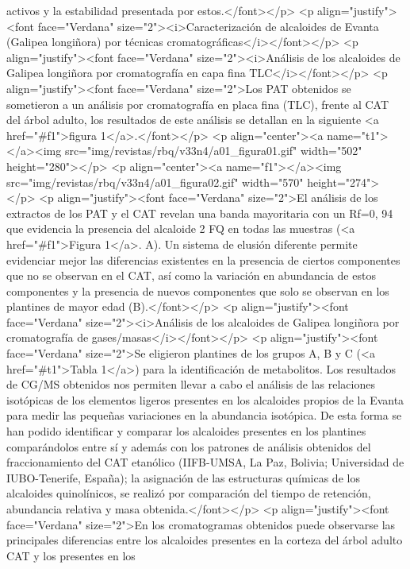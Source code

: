 activos y la estabilidad presentada por estos.</font></p> <p
align="justify"><font face="Verdana" size="2"><i>Caracterización de alcaloides
de Evanta (Galipea longiñora) por técnicas cromatográficas</i></font></p> <p
align="justify"><font face="Verdana" size="2"><i>Análisis de los alcaloides de
Galipea longiñora por cromatografía en capa fina TLC</i></font></p> <p
align="justify"><font face="Verdana" size="2">Los PAT obtenidos se sometieron a
un análisis por cromatografía en placa fina (TLC), frente al CAT del árbol
adulto, los resultados de este análisis se detallan en la siguiente <a
href="\#f1">figura 1</a>.</font></p> <p align="center"><a name="t1"></a><img
src="img/revistas/rbq/v33n4/a01\_{}figura01.gif" width="502" height="280"></p>
<p align="center"><a name="f1"></a><img
src="img/revistas/rbq/v33n4/a01\_{}figura02.gif" width="570" height="274"></p>
<p align="justify"><font face="Verdana" size="2">El análisis de los extractos de
los PAT y el CAT revelan una banda mayoritaria con un Rf=0, 94 que evidencia la
presencia del alcaloide 2 FQ en todas las muestras (<a href="\#f1">Figura 1</a>.
A). Un sistema de elusión diferente permite evidenciar mejor las diferencias
existentes en la presencia de ciertos componentes que no se observan en el CAT,
así como la variación en abundancia de estos componentes y la presencia de
nuevos componentes que solo se observan en los plantines de mayor edad
(B).</font></p> <p align="justify"><font face="Verdana" size="2"><i>Análisis de
los alcaloides de Galipea longiñora por cromatografía de
gases/masas</i></font></p> <p align="justify"><font face="Verdana" size="2">Se
eligieron plantines de los grupos A, B y C (<a href="\#t1">Tabla 1</a>) para la
identificación de metabolitos. Los resultados de CG/MS obtenidos nos permiten
llevar a cabo el análisis de las relaciones isotópicas de los elementos ligeros
presentes en los alcaloides propios de la Evanta para medir las pequeñas
variaciones en la abundancia isotópica. De esta forma se han podido identificar
y comparar los alcaloides presentes en los plantines comparándolos entre sí y
además con los patrones de análisis obtenidos del fraccionamiento del CAT
etanólico (IIFB-UMSA, La Paz, Bolivia; Universidad de IUBO-Tenerife, España); la
asignación de las estructuras químicas de los alcaloides quinolínicos, se
realizó por comparación del tiempo de retención, abundancia relativa y masa
obtenida.</font></p> <p align="justify"><font face="Verdana" size="2">En los
cromatogramas obtenidos puede observarse las principales diferencias entre los
alcaloides presentes en la corteza del árbol adulto CAT y los presentes en los
